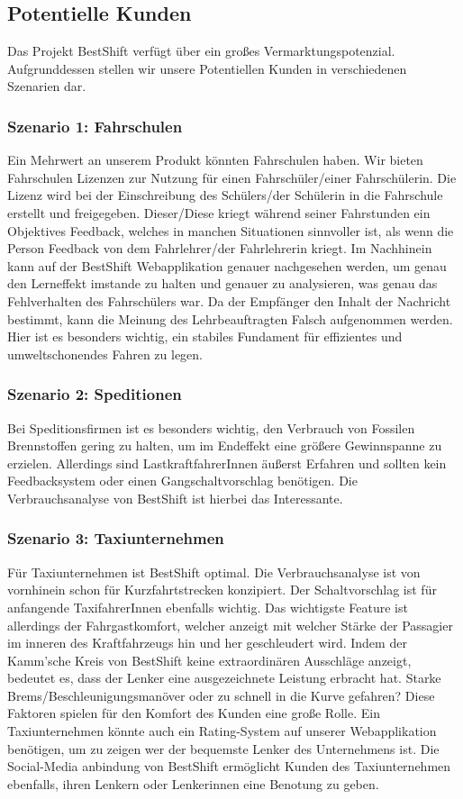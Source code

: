 \subsection{Potentielle Kunden}
Das Projekt BestShift verfügt über ein großes Vermarktungspotenzial.
Aufgrunddessen stellen wir unsere Potentiellen Kunden in verschiedenen Szenarien dar.

\subsubsection{Szenario 1: Fahrschulen}
Ein Mehrwert an unserem Produkt könnten Fahrschulen haben. Wir bieten Fahrschulen
Lizenzen zur Nutzung für einen Fahrschüler/einer Fahrschülerin. Die Lizenz wird bei der Einschreibung des
Schülers/der Schülerin in die Fahrschule erstellt und freigegeben. Dieser/Diese kriegt während seiner
Fahrstunden ein Objektives Feedback, welches in manchen Situationen sinnvoller ist,
als wenn die Person Feedback von dem Fahrlehrer/der Fahrlehrerin kriegt.
Im Nachhinein kann auf der BestShift Webapplikation genauer nachgesehen werden,
um genau den Lerneffekt imstande zu halten und genauer zu analysieren, was genau
das Fehlverhalten des Fahrschülers war.
Da der Empfänger den Inhalt der Nachricht bestimmt, kann die Meinung des Lehrbeauftragten
Falsch aufgenommen werden. Hier ist es besonders wichtig, ein stabiles Fundament für 
effizientes und umweltschonendes Fahren zu legen. 


\subsubsection{Szenario 2: Speditionen}
Bei Speditionsfirmen ist es besonders wichtig, den Verbrauch von Fossilen Brennstoffen gering zu halten, um
im Endeffekt eine größere Gewinnspanne zu erzielen. Allerdings sind LastkraftfahrerInnen äußerst Erfahren und
sollten kein Feedbacksystem oder einen Gangschaltvorschlag benötigen. Die Verbrauchsanalyse von BestShift ist hierbei
das Interessante.


\subsubsection{Szenario 3: Taxiunternehmen}
Für Taxiunternehmen ist BestShift optimal. Die Verbrauchsanalyse ist von vornhinein schon für Kurzfahrtstrecken
konzipiert. Der Schaltvorschlag ist für anfangende TaxifahrerInnen ebenfalls wichtig.
Das wichtigste Feature ist allerdings der Fahrgastkomfort, welcher anzeigt mit welcher Stärke der Passagier
im inneren des Kraftfahrzeugs hin und her geschleudert wird. Indem der Kamm'sche Kreis von BestShift keine 
extraordinären Ausschläge anzeigt, bedeutet es, dass der Lenker eine ausgezeichnete Leistung erbracht hat.
Starke Brems/Beschleunigungsmanöver oder zu schnell in die Kurve gefahren? Diese Faktoren spielen
für den Komfort des Kunden eine große Rolle. Ein Taxiunternehmen könnte auch ein Rating-System auf unserer
Webapplikation benötigen, um zu zeigen wer der bequemste Lenker des Unternehmens ist.
Die Social-Media anbindung von BestShift ermöglicht Kunden des Taxiunternehmen ebenfalls, ihren Lenkern oder
Lenkerinnen eine Benotung zu geben. 
